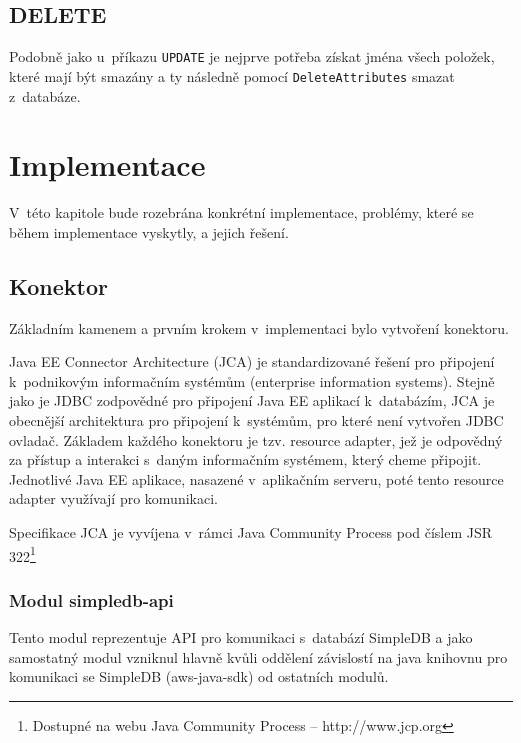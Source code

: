 \documentclass[oneside,12pt,final]{fithesis2}
\begin{document}
\section{DELETE}
Podobně jako u~příkazu \verb<UPDATE< je nejprve potřeba získat jména všech položek, které mají být smazány a ty následně pomocí \verb<DeleteAttributes< smazat z~databáze.
\chapter{Implementace}
\label{implementace}
V~této kapitole bude rozebrána konkrétní implementace, problémy, které se během implementace vyskytly, a jejich řešení.
\section{Konektor}
Základním kamenem a prvním krokem v~implementaci bylo vytvoření konektoru.

Java EE Connector Architecture (JCA) je standardizované řešení pro připojení k~podnikovým informačním systémům (enterprise information systems). Stejně jako je JDBC zodpovědné pro připojení Java EE aplikací k~databázím, JCA je obecnější architektura pro připojení k~systémům, pro které není vytvořen JDBC ovladač. Základem každého konektoru je tzv. resource adapter, jež je odpovědný za přístup a interakci s~daným informačním systémem, který cheme připojit. Jednotlivé Java EE aplikace, nasazené v~aplikačním serveru, poté tento resource adapter využívají pro komunikaci. 

Specifikace JCA je vyvíjena v~rámci Java Community Process pod číslem JSR 322\footnote{Dostupné na webu Java Community Process -- http://www.jcp.org}
\subsection{Modul simpledb-api}
Tento modul reprezentuje API pro komunikaci s~databází SimpleDB a jako samostatný modul vzniknul hlavně kvůli oddělení závislostí na java knihovnu pro komunikaci se SimpleDB (aws-java-sdk) od ostatních modulů.
\end{document}
